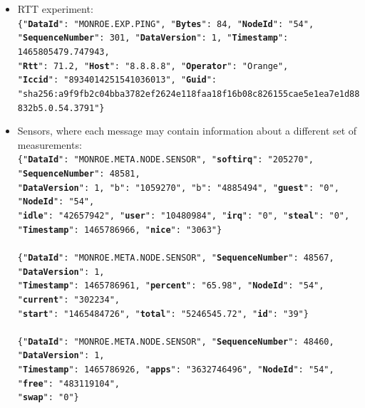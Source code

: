 \documentclass[a4paper,10pt]{article}
\begin{document}
\begin{itemize}
	\item RTT experiment:\\
	\texttt{\footnotesize\{"\textbf{DataId}": "MONROE.EXP.PING", "\textbf{Bytes}": 84, "\textbf{NodeId}": "54", \\
		"\textbf{SequenceNumber}": 301, "\textbf{DataVersion}": 1, "\textbf{Timestamp}": 1465805479.747943, \\
		"\textbf{Rtt}": 71.2, "\textbf{Host}": "8.8.8.8", "\textbf{Operator}": "Orange", \\
		"\textbf{Iccid}": "8934014251541036013", "\textbf{Guid}": \\ "sha256:a9f9fb2c04bba3782ef2624e118faa18f16b08c826155cae5e1ea7e1d88832b5.0.54.3791"\}}

	\item Sensors, where each message may contain information about a different set of measurements:\\
	\texttt{\footnotesize\{"\textbf{DataId}": "MONROE.META.NODE.SENSOR", "\textbf{softirq}": "205270", "\textbf{SequenceNumber}": 48581,\\
		"\textbf{DataVersion}": 1, "b": "1059270", "b": "4885494", "\textbf{guest}": "0", "\textbf{NodeId}": "54", \\
		"\textbf{idle}": "42657942", "\textbf{user}": "10480984", "\textbf{irq}": "0", "\textbf{steal}": "0", \\
		"\textbf{Timestamp}": 1465786966, "\textbf{nice}": "3063"\}}\\~\\
	\texttt{\footnotesize\{"\textbf{DataId}": "MONROE.META.NODE.SENSOR", "\textbf{SequenceNumber}": 48567, "\textbf{DataVersion}": 1,\\
		"\textbf{Timestamp}": 1465786961, "\textbf{percent}": "65.98", "\textbf{NodeId}": "54", "\textbf{current}": "302234", \\
		"\textbf{start}": "1465484726", "\textbf{total}": "5246545.72", "\textbf{id}": "39"\}}\\~\\
	\texttt{\footnotesize\{"\textbf{DataId}": "MONROE.META.NODE.SENSOR", "\textbf{SequenceNumber}": 48460, "\textbf{DataVersion}": 1,\\
		"\textbf{Timestamp}": 1465786926, "\textbf{apps}": "3632746496", "\textbf{NodeId}": "54", "\textbf{free}": "483119104", \\
		"\textbf{swap}": "0"\}}
	

\end{itemize}
\end{document}
